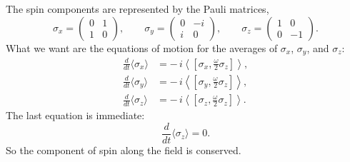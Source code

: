 The spin components are represented by the Pauli matrices,
\begin{equation}
\sigma_x=
\begin{pmatrix}
0&1\\
1&0
\end{pmatrix},
\qquad
\sigma_y=
\begin{pmatrix}
0&-i\\
i&0
\end{pmatrix},
\qquad
\sigma_z=
\begin{pmatrix}
1&0\\
0&-1
\end{pmatrix}.
\end{equation}
What we want are the equations of motion for the averages of \(\sigma_x\), \(\sigma_y\), and \(\sigma_z\):
\begin{align}
\frac{d}{dt}\langle \sigma_x\rangle
&=
-\,i\left\langle\left[\sigma_x,\frac{\omega}{2}\sigma_z\right]\right\rangle, \\
\frac{d}{dt}\langle \sigma_y\rangle
&=
-\,i\left\langle\left[\sigma_y,\frac{\omega}{2}\sigma_z\right]\right\rangle, \\
\frac{d}{dt}\langle \sigma_z\rangle
&=
-\,i\left\langle\left[\sigma_z,\frac{\omega}{2}\sigma_z\right]\right\rangle.
\end{align}
The last equation is immediate:
\begin{equation}
\frac{d}{dt}\langle \sigma_z\rangle = 0.
\end{equation}
So the component of spin along the field is conserved.

